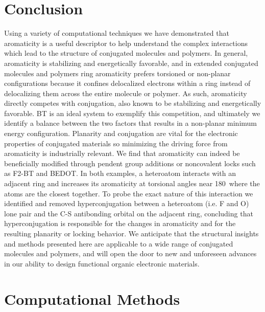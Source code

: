 \section{Conclusion}

Using a variety of computational techniques we have demonstrated that aromaticity is a useful descriptor to help understand the complex interactions which lead to the structure of conjugated molecules and polymers. In general, aromaticity is stabilizing and energetically favorable, and in extended conjugated molecules and polymers ring aromaticity prefers torsioned or non-planar configurations because it confines delocalized electrons within a ring instead of delocalizing them across the entire molecule or polymer. As such, aromaticity directly competes with conjugation, also known to be stabilizing and energetically favorable. BT is an ideal system to exemplify this competition, and ultimately we identify a balance between the two factors that results in a non-planar minimum energy configuration. Planarity and conjugation are vital for the electronic properties of conjugated materials so minimizing the driving force from aromaticity is industrially relevant. We find that aromaticity can indeed be beneficially modified through pendent group additions or noncovalent locks such as F2-BT and BEDOT. In both examples, a heteroatom interacts with an adjacent ring and increases its aromaticity at torsional angles near 180\textdegree \ where the atoms are the closest together. To probe the exact nature of this interaction we identified and removed hyperconjugation between a heteroatom (i.e. F and O) lone pair and the C-S antibonding orbital on the adjacent ring, concluding that hyperconjugation is responsible for the changes in aromaticity and for the resulting planarity or locking behavior. We anticipate that the structural insights and methods presented here are applicable to a wide range of conjugated molecules and polymers, and will open the door to new and unforeseen advances in our ability to design functional organic electronic materials.

\section{Computational Methods}

